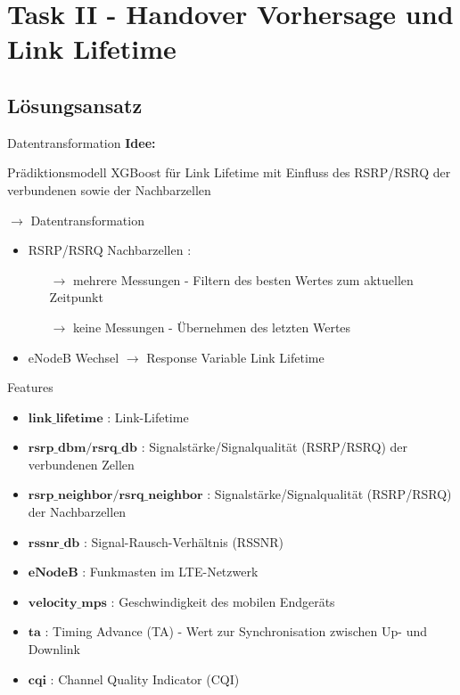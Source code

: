 \section{Task II - Handover Vorhersage und Link Lifetime}

\subsection{L\"osungsansatz}


\begin{frame}{Datentransformation}
\textbf{Idee:}

Prädiktionsmodell XGBoost für Link Lifetime mit Einfluss des RSRP/RSRQ der verbundenen sowie der Nachbarzellen

$\rightarrow$ Datentransformation

	\begin{itemize}
		\item RSRP/RSRQ Nachbarzellen :
		\begin{itemize}
		    \item[$\rightarrow$] mehrere Messungen - Filtern des besten Wertes zum aktuellen Zeitpunkt
		    \item[$\rightarrow$] keine Messungen - Übernehmen des letzten Wertes
		\end{itemize}
		\item eNodeB Wechsel $\rightarrow$ Response Variable Link Lifetime
	\end{itemize} 
\end{frame}





\begin{frame}{Features}
	\begin{itemize}
		\item $\textbf{link\_lifetime}$ : Link-Lifetime
		\item $\textbf{rsrp\_dbm/rsrq\_db}$ : Signalstärke/Signalqualität (RSRP/RSRQ) der verbundenen Zellen
		\item $\textbf{rsrp\_neighbor/rsrq\_neighbor}$ : Signalstärke/Signalqualität (RSRP/RSRQ) der Nachbarzellen
		\item $\textbf{rssnr\_db}$ : Signal-Rausch-Verhältnis (RSSNR)
		\item $\textbf{eNodeB}$ : Funkmasten im LTE-Netzwerk
		\item $\textbf{velocity\_mps}$ : Geschwindigkeit des mobilen Endgeräts
		\item $\textbf{ta}$ : Timing Advance (TA) - Wert zur Synchronisation zwischen Up- und Downlink 
		\item $\textbf{cqi}$ : Channel Quality Indicator (CQI) 
	\end{itemize}
\end{frame}




